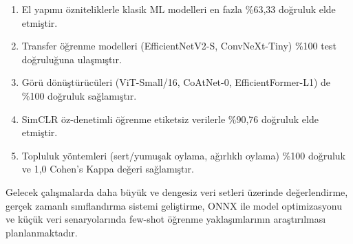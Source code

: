 \documentclass[conference]{IEEEtran}
\begin{document}
\begin{enumerate}
    \item El yap{\i}m{\i} \"{o}zniteliklerle klasik ML modelleri en fazla \%63,33 do\u{g}ruluk elde etmi\c{s}tir.
    \item Transfer \"{o}\u{g}renme modelleri (EfficientNetV2-S, ConvNeXt-Tiny) \%100 test do\u{g}rulu\u{g}una ula\c{s}m{\i}\c{s}t{\i}r.
    \item G\"{o}r\"{u} d\"{o}n\"{u}\c{s}t\"{u}r\"{u}c\"{u}leri (ViT-Small/16, CoAtNet-0, EfficientFormer-L1) de \%100 do\u{g}ruluk sa\u{g}lam{\i}\c{s}t{\i}r.
    \item SimCLR \"{o}z-denetimli \"{o}\u{g}renme etiketsiz verilerle \%90,76 do\u{g}ruluk elde etmi\c{s}tir.
    \item Topluluk y\"{o}ntemleri (sert/yumu\c{s}ak oylama, a\u{g}{\i}rl{\i}kl{\i} oylama) \%100 do\u{g}ruluk ve 1,0 Cohen's Kappa de\u{g}eri sa\u{g}lam{\i}\c{s}t{\i}r.
\end{enumerate}

Gelecek \c{c}al{\i}\c{s}malarda daha b\"{u}y\"{u}k ve dengesiz veri setleri \"{u}zerinde de\u{g}erlendirme, ger\c{c}ek zamanl{\i} s{\i}n{\i}fland{\i}rma sistemi geli\c{s}tirme, ONNX ile model optimizasyonu ve k\"{u}\c{c}\"{u}k veri senaryolar{\i}nda few-shot \"{o}\u{g}renme yakla\c{s}{\i}mlar{\i}n{\i}n ara\c{s}t{\i}r{\i}lmas{\i} planlanmaktad{\i}r.

\balance


\end{document}
